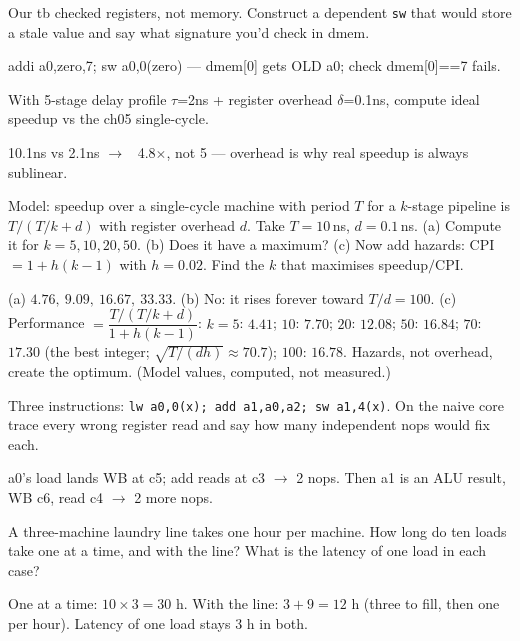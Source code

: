 \begin{exercise}[medium]\label{ex:m06d}
Our tb checked registers, not memory. Construct a dependent
\texttt{sw} that would store a stale value and say what signature
you'd check in dmem.
\end{exercise}
\begin{solution}[hint]
addi a0,zero,7; sw a0,0(zero) --- dmem[0] gets OLD a0; check
dmem[0]==7 fails.
\end{solution}

\begin{exercise}[medium]\label{ex:m06e}
With 5-stage delay profile $\tau$=2ns + register overhead
$\delta$=0.1ns, compute ideal speedup vs the ch05 single-cycle.
\end{exercise}
\begin{solution}[hint]
10.1ns vs 2.1ns $\to$ ~4.8$\times$, not 5 --- overhead is why real
speedup is always sublinear.
\end{solution}

\begin{exercise}[hard]\label{ex:h06a}
Model: speedup over a single-cycle machine with period $T$ for a
$k$-stage pipeline is $T/(T/k+d)$ with register overhead $d$. Take
$T=10$\,ns, $d=0.1$\,ns. (a) Compute it for $k=5,10,20,50$. (b) Does
it have a maximum? (c) Now add hazards: CPI $=1+h(k-1)$ with $h=0.02$.
Find the $k$ that maximises speedup$/$CPI.
\end{exercise}
\begin{solution}[hint]
(a) $4.76,\ 9.09,\ 16.67,\ 33.33$. (b) No: it rises forever toward
$T/d=100$. (c) Performance $=\dfrac{T/(T/k+d)}{1+h(k-1)}$:
$k=5$: $4.41$; $10$: $7.70$; $20$: $12.08$; $50$: $16.84$; $70$: $17.30$
(the best integer; $\sqrt{T/(dh)}\approx70.7$); $100$: $16.78$. Hazards,
not overhead, create the optimum. (Model values, computed, not
measured.)
\end{solution}

\begin{exercise}[hard]\label{ex:h06b}
Three instructions: \texttt{lw a0,0(x); add a1,a0,a2; sw a1,4(x)}.
On the naive core trace every wrong register read and say how many
independent nops would fix each.
\end{exercise}
\begin{solution}[hint]
a0's load lands WB at c5; add reads at c3 $\to$ 2 nops. Then a1 is
an ALU result, WB c6, read c4 $\to$ 2 more nops.
\end{solution}


\begin{exercise}[easy]\label{ex:e06c}
A three-machine laundry line takes one hour per machine. How long do
ten loads take one at a time, and with the line? What is the latency
of one load in each case?
\end{exercise}
\begin{solution}[hint]
One at a time: $10\times3=30$ h. With the line: $3+9=12$ h (three to
fill, then one per hour). Latency of one load stays 3 h in both.
\end{solution}

